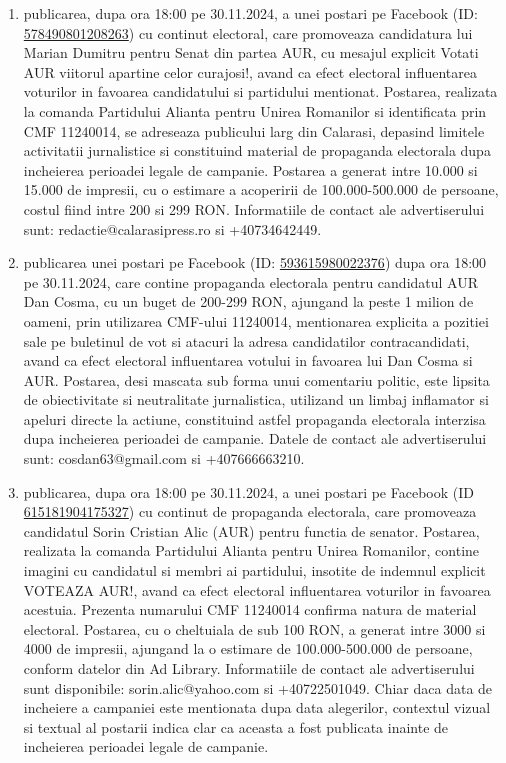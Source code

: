 \documentclass[a4paper,12pt]{article}
\begin{document}
\begin{enumerate}[leftmargin=*, label=\arabic*.)]
    \item publicarea, dupa ora 18:00 pe 30.11.2024, a unei postari pe Facebook (ID: \href{https://www.facebook.com/ads/library/?id=578490801208263}{578490801208263}) cu continut electoral, care promoveaza candidatura lui Marian Dumitru pentru Senat din partea AUR, cu mesajul explicit Votati AUR  viitorul apartine celor curajosi!, avand ca efect electoral influentarea voturilor in favoarea candidatului si partidului mentionat. Postarea, realizata la comanda Partidului Alianta pentru Unirea Romanilor si identificata prin CMF 11240014, se adreseaza publicului larg din Calarasi, depasind limitele activitatii jurnalistice si constituind material de propaganda electorala dupa incheierea perioadei legale de campanie.  Postarea a generat intre 10.000 si 15.000 de impresii, cu o estimare a acoperirii de 100.000-500.000 de persoane,  costul fiind intre 200 si 299 RON.  Informatiile de contact ale advertiserului sunt: redactie@calarasipress.ro si +40734642449.
    \item publicarea unei postari pe Facebook (ID: \href{https://www.facebook.com/ads/library/?id=593615980022376}{593615980022376}) dupa ora 18:00 pe 30.11.2024, care contine propaganda electorala pentru candidatul AUR Dan Cosma,  cu un buget de 200-299 RON,  ajungand la peste 1 milion de oameni,  prin utilizarea CMF-ului 11240014,  mentionarea explicita a pozitiei sale pe buletinul de vot si atacuri la adresa candidatilor contracandidati,  avand ca efect electoral influentarea votului in favoarea lui Dan Cosma si AUR.  Postarea, desi mascata sub forma unui comentariu politic,  este lipsita de obiectivitate si neutralitate jurnalistica,  utilizand un limbaj inflamator si apeluri directe la actiune,  constituind astfel propaganda electorala interzisa dupa incheierea perioadei de campanie.  Datele de contact ale advertiserului sunt: cosdan63@gmail.com si +407666663210.
    \item publicarea, dupa ora 18:00 pe 30.11.2024, a unei postari pe Facebook (ID \href{https://www.facebook.com/ads/library/?id=615181904175327}{615181904175327}) cu continut de propaganda electorala, care promoveaza candidatul Sorin Cristian Alic (AUR) pentru functia de senator. Postarea, realizata la comanda Partidului Alianta pentru Unirea Romanilor, contine imagini cu candidatul si membri ai partidului, insotite de indemnul explicit VOTEAZA AUR!, avand ca efect electoral influentarea voturilor in favoarea acestuia.  Prezenta numarului CMF 11240014 confirma natura de material electoral.  Postarea, cu o cheltuiala de sub 100 RON, a generat intre 3000 si 4000 de impresii, ajungand la o estimare de 100.000-500.000 de persoane, conform datelor din Ad Library.  Informatiile de contact ale advertiserului sunt disponibile: sorin.alic@yahoo.com si +40722501049.  Chiar daca data de incheiere a campaniei este mentionata dupa data alegerilor, contextul vizual si textual al postarii indica clar ca aceasta a fost publicata inainte de incheierea perioadei legale de campanie.

\end{enumerate}
\end{document}
